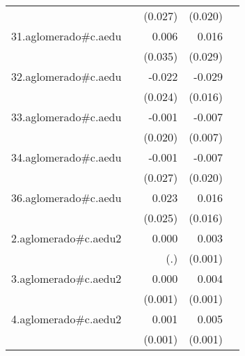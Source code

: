 {\begin{longtable}{l*{4}{D{.}{.}{-1}}}
            &                     &     (0.027)         &     (0.020)         &                     \\
\addlinespace
31.aglomerado#c.aedu&                     &       0.006         &       0.016         &                     \\
            &                     &     (0.035)         &     (0.029)         &                     \\
\addlinespace
32.aglomerado#c.aedu&                     &      -0.022         &      -0.029         &                     \\
            &                     &     (0.024)         &     (0.016)         &                     \\
\addlinespace
33.aglomerado#c.aedu&                     &      -0.001         &      -0.007         &                     \\
            &                     &     (0.020)         &     (0.007)         &                     \\
\addlinespace
34.aglomerado#c.aedu&                     &      -0.001         &      -0.007         &                     \\
            &                     &     (0.027)         &     (0.020)         &                     \\
\addlinespace
36.aglomerado#c.aedu&                     &       0.023         &       0.016         &                     \\
            &                     &     (0.025)         &     (0.016)         &                     \\
\addlinespace
2.aglomerado#c.aedu2&                     &       0.000         &       0.003\sym{***}&                     \\
            &                     &         (.)         &     (0.001)         &                     \\
\addlinespace
3.aglomerado#c.aedu2&                     &       0.000         &       0.004\sym{***}&                     \\
            &                     &     (0.001)         &     (0.001)         &                     \\
\addlinespace
4.aglomerado#c.aedu2&                     &       0.001         &       0.005\sym{***}&                     \\
            &                     &     (0.001)         &     (0.001)         &                     \\

\end{longtable}}
